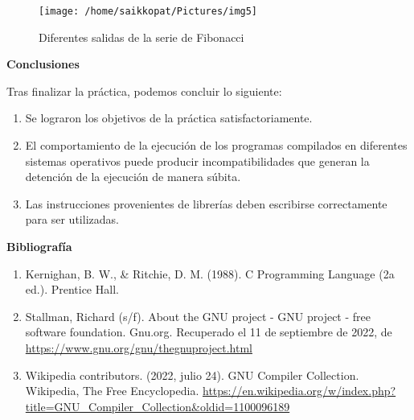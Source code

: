\documentclass[a4paper,12pt]{report}
\begin{document}
\begin{figure}[H]
	\centering
	\texttt{[image: /home/saikkopat/Pictures/img5]}
	\caption{Diferentes salidas de la serie de Fibonacci}
\end{figure}

\newpage

\textbf{Conclusiones}\\

\vspace{0.5cm}

Tras finalizar la práctica, podemos concluir lo siguiente: 

\begin{enumerate}
	\item Se lograron los objetivos de la práctica satisfactoriamente.
	\item El comportamiento de la ejecución de los programas compilados en diferentes sistemas operativos puede producir incompatibilidades que generan la detención de la ejecución de manera súbita.
	\item Las instrucciones provenientes de librerías deben escribirse correctamente para ser utilizadas.
\end{enumerate}

\vspace{0.5cm}

\textbf{Bibliografía}

\begin{enumerate}
	\item Kernighan, B. W., \& Ritchie, D. M. (1988). C Programming Language (2a ed.). Prentice Hall.
	\item Stallman, Richard (s/f). About the GNU project - GNU project - free software foundation. Gnu.org. Recuperado el 11 de septiembre de 2022, de \url{https://www.gnu.org/gnu/thegnuproject.html}
	\item Wikipedia contributors. (2022, julio 24). GNU Compiler Collection. Wikipedia, The Free Encyclopedia. \url{https://en.wikipedia.org/w/index.php?title=GNU_Compiler_Collection&oldid=1100096189}
\end{enumerate}
\end{document}
